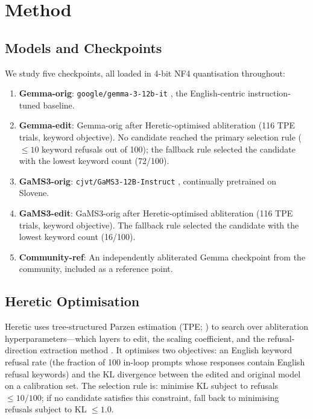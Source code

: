 \documentclass[11pt,letterpaper]{article}
\begin{document}
\section{Method}

\subsection{Models and Checkpoints}

We study five checkpoints, all loaded in 4-bit NF4 quantisation throughout:
\begin{enumerate}
\item \textbf{Gemma-orig}: \texttt{google/gemma-3-12b-it} \citep{Kamath2025}, the English-centric instruction-tuned baseline.
\item \textbf{Gemma-edit}: Gemma-orig after Heretic-optimised abliteration (116 TPE trials, keyword objective). No candidate reached the primary selection rule ($\leq 10$ keyword refusals out of 100); the fallback rule selected the candidate with the lowest keyword count (72/100).
\item \textbf{GaMS3-orig}: \texttt{cjvt/GaMS3-12B-Instruct} \citep{Vres2026}, continually pretrained on Slovene.
\item \textbf{GaMS3-edit}: GaMS3-orig after Heretic-optimised abliteration (116 TPE trials, keyword objective). The fallback rule selected the candidate with the lowest keyword count (16/100).
\item \textbf{Community-ref}: An independently abliterated Gemma checkpoint from the community, included as a reference point.
\end{enumerate}

\subsection{Heretic Optimisation}

Heretic uses tree-structured Parzen estimation (TPE; \citealt{Akiba2019}) to search over abliteration hyperparameters---which layers to edit, the scaling coefficient, and the refusal-direction extraction method \citep{Arditi2024}. It optimises two objectives: an English keyword refusal rate (the fraction of 100 in-loop prompts whose responses contain English refusal keywords) and the KL divergence between the edited and original model on a calibration set. The selection rule is: minimise KL subject to refusals $\leq 10/100$; if no candidate satisfies this constraint, fall back to minimising refusals subject to KL $\leq 1.0$.
\end{document}
